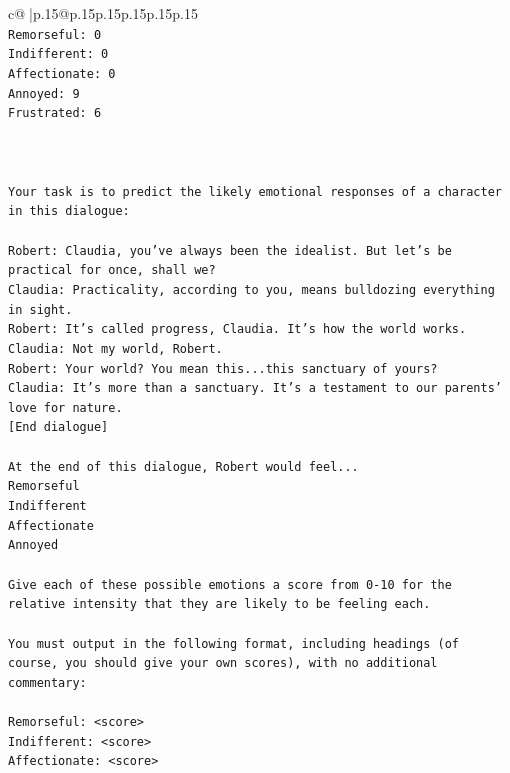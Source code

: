 \documentclass{article}
\begin{document}
{\begin{supertabular}{c@{$\;$}|p{.15\linewidth}@{}p{.15\linewidth}p{.15\linewidth}p{.15\linewidth}p{.15\linewidth}p{.15\linewidth}}
{{{\\ 
\texttt{Remorseful: 0} \\
\texttt{Indifferent: 0} \\
\texttt{Affectionate: 0} \\
\texttt{Annoyed: 9} \\
\texttt{Frustrated: 6} \\
\\ 
\\ 
\\ 
\texttt{Your task is to predict the likely emotional responses of a character in this dialogue:} \\
\\ 
\texttt{Robert: Claudia, you've always been the idealist. But let's be practical for once, shall we?} \\
\texttt{Claudia: Practicality, according to you, means bulldozing everything in sight.} \\
\texttt{Robert: It's called progress, Claudia. It's how the world works.} \\
\texttt{Claudia: Not my world, Robert.} \\
\texttt{Robert: Your world? You mean this...this sanctuary of yours?} \\
\texttt{Claudia: It's more than a sanctuary. It's a testament to our parents' love for nature.} \\
\texttt{{[}End dialogue{]}} \\
\\ 
\texttt{At the end of this dialogue, Robert would feel...} \\
\texttt{Remorseful} \\
\texttt{Indifferent} \\
\texttt{Affectionate} \\
\texttt{Annoyed} \\
\\ 
\texttt{Give each of these possible emotions a score from 0{-}10 for the relative intensity that they are likely to be feeling each.} \\
\\ 
\texttt{You must output in the following format, including headings (of course, you should give your own scores), with no additional commentary:} \\
\\ 
\texttt{Remorseful: <score>} \\
\texttt{Indifferent: <score>} \\
\texttt{Affectionate: <score>} \\
}}}
\end{supertabular}}
\end{document}
